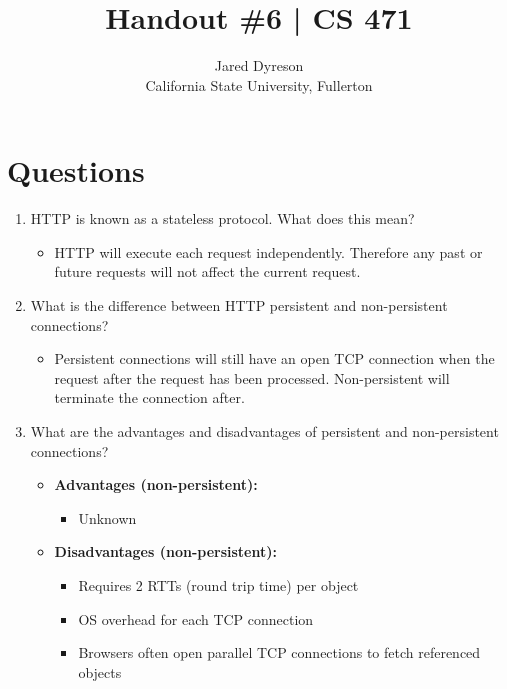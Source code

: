 \documentclass{article}
\title{Handout \#6 | CS 471}
\author{Jared Dyreson\\ 
        California State University, Fullerton}
\begin{document}
\maketitle
\tableofcontents

\newpage

\section{Questions}

\begin{enumerate}

\item HTTP is known as a stateless protocol. What does this mean?

\begin{itemize}
\item HTTP will execute each request independently. Therefore any past or future requests will not affect the current request.
\end{itemize}

\item What is the difference between HTTP persistent and non-persistent connections?

\begin{itemize}
\item Persistent connections will still have an open TCP connection when the request after the request has been processed. Non-persistent will terminate the connection after.
\end{itemize}

\item What are the advantages and disadvantages of persistent and non-persistent connections?

\begin{itemize}

\item \textbf{Advantages (non-persistent):}

\begin{itemize}
\item Unknown
\end{itemize}

\item \textbf{Disadvantages (non-persistent):}

\begin{itemize}
\item Requires 2 RTTs (round trip time) per object
\item OS overhead for each TCP connection
\item Browsers often open parallel TCP connections to fetch referenced objects
\end{itemize}


\end{itemize}
\end{enumerate}
\end{document}
